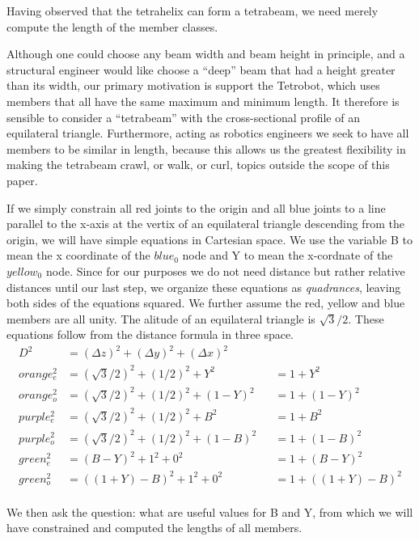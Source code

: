 \documentclass[11pt]{article}
\begin{document}
 Having observed that the tetrahelix can form a tetrabeam, we need merely compute the length of the member classes.

 Although one could choose any beam width and beam height in principle, and a structural engineer would like choose a ``deep'' beam that had
 a height greater than its width, our primary motivation is support the Tetrobot, which uses members that all have the same maximum and
 minimum length. It therefore is sensible to consider a ``tetrabeam'' with the cross-sectional profile of an equilateral triangle.
 Furthermore, acting as robotics engineers we seek to have all members to be similar in length, because this allows us the greatest
 flexibility in making the tetrabeam crawl, or walk, or curl, topics outside the scope of this paper.

 If we simply constrain all red joints to the origin and all blue joints to a line parallel to the x-axis at the vertix of an equilateral
 triangle descending from the origin, we will have simple equations in Cartesian space. We use the variable B to mean the x coordinate
 of the $blue_0$ node and Y to mean the x-cordnate of the $yellow_0$ node. Since for our purposes we do not need distance but rather relative distances
 until our last step, we organize these equations as \emph{quadrances}, leaving both sides of the equations squared.
 We further assume the red, yellow and blue members are all unity. The alitude of an equilateral triangle is $\sqrt{3}/2$.
 These equations follow from the distance formula in three space.
 \begin{align*}
   D^2 &= (\Delta z)^2 + (\Delta y)^2 + (\Delta x)^2 \\
 orange_e^2 &= (\sqrt{3}/2)^2 + (1/2)^2 + Y^2 & &= 1 + Y^2\\
 orange_o^2 &= (\sqrt{3}/2)^2 + (1/2)^2 + (1-Y)^2 & &= 1 + (1-Y)^2\\
 purple_e^2 &= (\sqrt{3}/2)^2 + (1/2)^2 + B^2 & &= 1 + B^2\\
 purple_o^2 &= (\sqrt{3}/2)^2 + (1/2)^2 + (1-B)^2 & &=  1+ (1-B)^2\\
 green_e^2 &= (B - Y)^2 + 1^2 + 0^2 & &= 1 + (B - Y)^2 \\ 
 green_o^2 &= ((1+Y) - B)^2 + 1^2 + 0^2 & &= 1 + ((1+Y) - B)^2 \\ 
\end{align*}

 We then ask the question: what are useful values for B and Y, from which we will have constrained and computed the lengths of all
 members.
\end{document}
